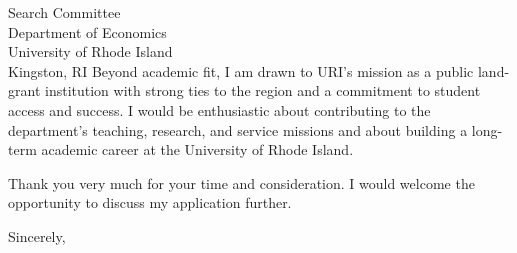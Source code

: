 \documentclass[11pt,letterpaper]{letter}
\begin{document}
\begin{letter}{
Search Committee \\
Department of Economics \\
University of Rhode Island \\
Kingston, RI
}
Beyond academic fit, I am drawn to URI’s mission as a public land-grant institution with strong ties to the region and a commitment to student access and success. I would be enthusiastic about contributing to the department’s teaching, research, and service missions and about building a long-term academic career at the University of Rhode Island.

Thank you very much for your time and consideration. I would welcome the opportunity to discuss my application further.

\closing{Sincerely,}

\end{letter}
\end{document}
